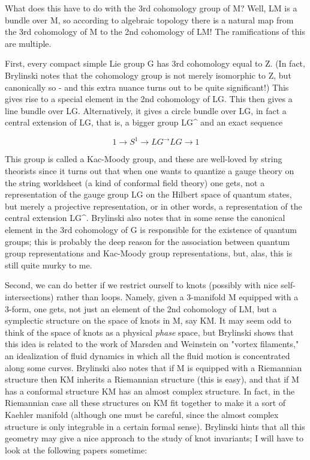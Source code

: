 What does this have to do with the 3rd cohomology group of M?  Well, LM
is a bundle over M, so according to algebraic topology there is a
natural map from the 3rd cohomology of M to the 2nd cohomology of LM!
The ramifications of this are multiple.  

First, every compact simple Lie group G has 3rd cohomology equal to Z.
(In fact, Brylinski notes that the cohomology group is not merely
isomorphic to Z, but canonically so - and this extra nuance turns out to
be quite significant!)  This gives rise to a special element in the 2nd
cohomology of LG.  This then gives a line bundle over LG.
Alternatively, it gives a circle bundle over LG, in fact a central
extension of LG, that is, a bigger group LG^ and an exact sequence

$$
             1 \to  S^1 \to  LG^ \to  LG \to  1
$$
    

This group is called a Kac-Moody group, and these are well-loved by
string theorists since it turns out that when one wants to quantize a
gauge theory on the string worldsheet (a kind of conformal field theory)
one gets, not a representation of the gauge group LG on the Hilbert
space of quantum states, but merely a projective representation, or in
other words, a representation of the central extension LG^.  Brylinski
also notes that in some sense the canonical element in the 3rd
cohomology of G is responsible for the existence of quantum groups; this
is probably the deep reason for the association between quantum group
representations and Kac-Moody group representations, but, alas, this is
still quite murky to me.

Second, we can do better if we restrict ourself to knots (possibly with
nice self-intersections) rather than loops.  Namely, given a 3-manifold
M equipped with a 3-form, one gets, not just an element of the 2nd
cohomology of LM, but a symplectic structure on the space of knots in M,
say KM.  It may seem odd to think of the space of knots as a physical
\emph{phase} space, but Brylinski shows that this idea is related to the work
of Marsden and Weinstein on "vortex filaments," an idealization of fluid
dynamics in which all the fluid motion is concentrated along some
curves.  Brylinski also notes that if M is equipped with a Riemannian
structure then KM inherits a Riemannian structure (this is easy), and
that if M has a conformal structure KM has an almost complex structure.
In fact, in the Riemannian case all these structures on KM fit together
to make it a sort of Kaehler manifold (although one must be careful,
since the almost complex structure is only integrable in a certain
formal sense).  Brylinski hints that all this geometry may give a
nice approach to the study of knot invariants; I will have to look at
the following papers sometime:

